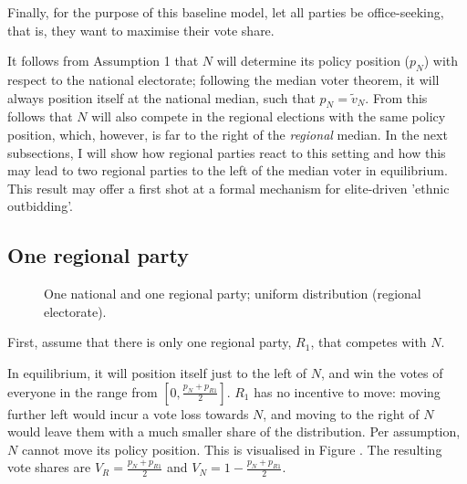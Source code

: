 \documentclass[11pt]{article}
\begin{document}
Finally, for the purpose of this baseline model, let all parties be office-seeking, that is, they want to maximise their vote share.

It follows from Assumption 1 that $N$ will determine its policy position ($p_N$) with respect to the national electorate; following the median voter theorem, it will always position itself at the national median, such that $p_N = \tilde{v}_N$. From this follows that $N$ will also compete in the regional elections with the same policy position, which, however, is far to the right of the \textit{regional} median. In the next subsections, I will show how regional parties react to this setting and how this may lead to two regional parties to the left of the median voter in equilibrium. This result may offer a first shot at a formal mechanism for elite-driven 'ethnic outbidding'.


\subsection{One regional party}

\begin{figure}[ht]
    \centering 
     \caption{One national and one regional party; uniform distribution (regional electorate).} \label{fig:mod1}
 \end{figure}

 First, assume that there is only one regional party, $R_1$, that competes with $N$. 

 In equilibrium, it will position itself just to the left of $N$, and win the votes of everyone in the range from $[0, \frac{p_N + p_{R1}}{2}]$. $R_1$ has no incentive to move: moving further left would incur a vote loss towards $N$, and moving to the right of $N$ would leave them with a much smaller share of the distribution. Per assumption, $N$ cannot move its policy position. This is visualised in Figure \label{fig:mod1}. The resulting vote shares are $V_R = \frac{p_N + p_{R1}}{2}$ and $V_N = 1 - \frac{p_N + p_{R1}}{2}$.
\end{document}
